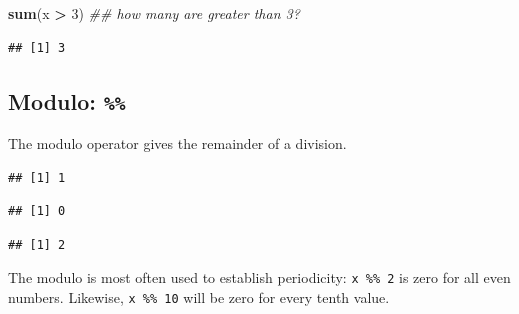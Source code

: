 \documentclass[]{book}
\newenvironment{Shaded}{\begin{snugshade}}{\end{snugshade}}
\newcommand{\CommentTok}[1]{\textcolor[rgb]{0.56,0.35,0.01}{\textit{#1}}}
\newcommand{\DecValTok}[1]{\textcolor[rgb]{0.00,0.00,0.81}{#1}}
\newcommand{\KeywordTok}[1]{\textcolor[rgb]{0.13,0.29,0.53}{\textbf{#1}}}
\newcommand{\NormalTok}[1]{#1}
\newcommand{\OperatorTok}[1]{\textcolor[rgb]{0.81,0.36,0.00}{\textbf{#1}}}
\newcommand{\StringTok}[1]{\textcolor[rgb]{0.31,0.60,0.02}{#1}}
\begin{document}
\begin{Shaded}
\begin{Highlighting}[]
\KeywordTok{sum}\NormalTok{(x }\OperatorTok{>}\StringTok{ }\DecValTok{3}\NormalTok{) }\CommentTok{## how many are greater than 3?}
\end{Highlighting}
\end{Shaded}

\begin{verbatim}
## [1] 3
\end{verbatim}

\hypertarget{modulo}{%
\subsection{\texorpdfstring{Modulo: \texttt{\%\%}}{Modulo: \%\%}}\label{modulo}}

The modulo operator gives the remainder of a division.

\begin{Shaded}
\end{Shaded}

\begin{verbatim}
## [1] 1
\end{verbatim}

\begin{Shaded}
\end{Shaded}

\begin{verbatim}
## [1] 0
\end{verbatim}

\begin{Shaded}
\end{Shaded}

\begin{verbatim}
## [1] 2
\end{verbatim}

The modulo is most often used to establish periodicity: \texttt{x\ \%\%\ 2} is zero for all even numbers. Likewise, \texttt{x\ \%\%\ 10} will be zero for every tenth value.
\end{document}
